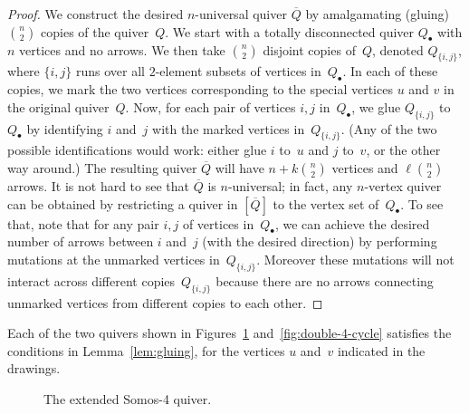 \begin{proof}
We construct the desired $n$-universal quiver $\overline Q$ by amalgamating (gluing) $\binom{n}{2}$ copies of the quiver~$Q$. 
We start with a totally disconnected quiver $Q_\bullet$ with $n$ vertices and no arrows. 
We then take $\binom{n}{2}$ disjoint copies of~$Q$, denoted $Q_{\{i,j\}}$, where $\{i,j\}$ runs over all $2$-element subsets of vertices in~$Q_\bullet$. 
In each of these copies, we mark the two vertices corresponding to the special vertices $u$ and $v$ in the original quiver~$Q$. 
Now, for each pair of vertices $i,j$ in~$Q_\bullet$, we glue $Q_{\{i,j\}}$ to~$Q_\bullet$ by identifying $i$ and~$j$ with the marked vertices in~$Q_{\{i,j\}}$. (Any of the two possible identifications would work: either glue $i$ to~$u$ and $j$ to~$v$, or the other way around.) The resulting quiver $\overline Q$ will have $n+k\binom{n}{2}$ vertices and $\ell\binom{n}{2}$ arrows. It is not hard to see that $\overline Q$ is \hbox{$n$-universal}; in fact, any $n$-vertex quiver can be obtained by restricting a quiver in $[\overline Q]$ to the vertex set of~$Q_\bullet$. To see that, note that for any pair $i,j$ of vertices in~$Q_\bullet$, we can achieve the desired number of arrows between $i$ and~$j$ (with the desired direction) by performing mutations at the unmarked vertices in~$Q_{\{i,j\}}$. Moreover these mutations will not interact across different copies~$Q_{\{i,j\}}$ because there are no arrows connecting unmarked vertices from different copies to each other. 
\end{proof}


\begin{lemma}
\label{lem:6-vertex-quivers}
Each of the two quivers shown in Figures~\ref{fig:extended-somos-4}
and~\ref{fig:double-4-cycle}
satisfies the conditions in Lemma~\ref{lem:gluing}, for the vertices $u$ and~$v$ indicated in the drawings. 
\end{lemma}

\begin{figure}[ht]\centering
{}
\caption{The extended Somos-4 quiver.}
\label{fig:extended-somos-4}
\end{figure}

